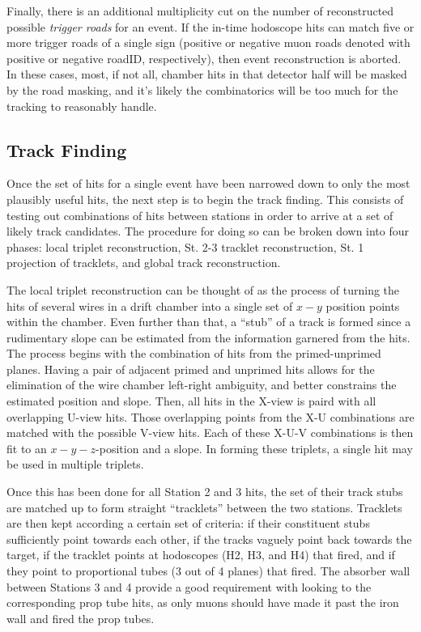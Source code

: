 Finally, there is an additional multiplicity cut on the number of reconstructed possible \emph{trigger roads} for an event. If the in-time hodoscope hits can match five or more trigger roads of a single sign (positive or negative muon roads denoted with positive or negative roadID, respectively), then event reconstruction is aborted. In these cases, most, if not all, chamber hits in that detector half will be masked by the road masking, and it's likely the combinatorics will be too much for the tracking to reasonably handle.

\subsection{Track Finding}

Once the set of hits for a single event have been narrowed down to only the most plausibly useful hits, the next step is to begin the track finding. This consists of testing out combinations of hits between stations in order to arrive at a set of likely track candidates. The procedure for doing so can be broken down into four phases: local triplet reconstruction, St. 2-3 tracklet reconstruction, St. 1 projection of tracklets, and global track reconstruction.

The local triplet reconstruction can be thought of as the process of turning the hits of several wires in a drift chamber into a single set of $x-y$ position points within the chamber. Even further than that, a ``stub'' of a track is formed since a rudimentary slope can be estimated from the information garnered from the hits. The process begins with the combination of hits from the primed-unprimed planes. Having a pair of adjacent primed and unprimed hits allows for the elimination of the wire chamber left-right ambiguity, and better constrains the estimated position and slope. Then, all hits in the X-view is paird with all overlapping U-view hits. Those overlapping points from the X-U combinations are matched with the possible V-view hits. Each of these X-U-V combinations is then fit to an $x-y-z$-position and a slope. In forming these triplets, a single hit may be used in multiple triplets.

Once this has been done for all Station 2 and 3 hits, the set of their track stubs are matched up to form straight ``tracklets'' between the two stations. Tracklets are then kept according a certain set of criteria: if their constituent stubs sufficiently point towards each other, if the tracks vaguely point back towards the target, if the tracklet points at hodoscopes (H2, H3, and H4) that fired, and if they point to proportional tubes (3 out of 4 planes) that fired. The absorber wall between Stations 3 and 4 provide a good requirement with looking to the corresponding prop tube hits, as only muons should have made it past the iron wall and fired the prop tubes.

